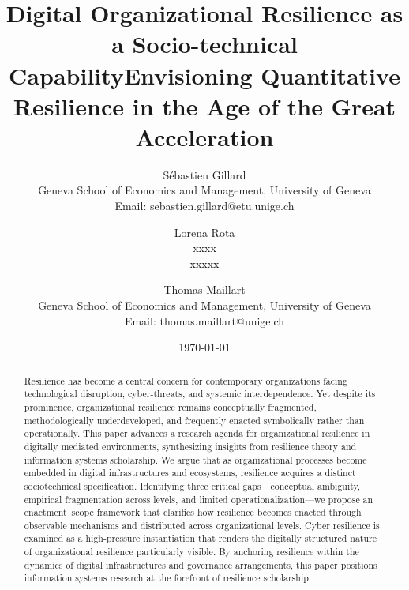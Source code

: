 \documentclass[12pt, letterpaper]{article}
\title{\textbf{Digital Organizational Resilience as a Socio-technical Capability}}
\begin{document}
\title{Envisioning Quantitative Resilience in the Age of the Great Acceleration}

\author{Sébastien Gillard \\
  Geneva School of Economics and Management, University of Geneva \\
  Email: sebastien.gillard@etu.unige.ch
  \and
  Lorena Rota \\
  xxxx \\
  xxxxx
  \and
  Thomas Maillart \\
  Geneva School of Economics and Management, University of Geneva \\
  Email: thomas.maillart@unige.ch \vspace{20pt}}


\date{\today}

\maketitle

\begin{abstract}
\vspace*{4mm}
Resilience has become a central concern for contemporary organizations facing technological disruption, cyber-threats, and systemic interdependence. Yet despite its prominence, organizational resilience remains conceptually fragmented, methodologically underdeveloped, and frequently enacted symbolically rather than operationally. This paper advances a research agenda for organizational resilience in digitally mediated environments, synthesizing insights from resilience theory and information systems scholarship. We argue that as organizational processes become embedded in digital infrastructures and ecosystems, resilience acquires a distinct sociotechnical specification. Identifying three critical gaps—conceptual ambiguity, empirical fragmentation across levels, and limited operationalization—we propose an enactment–scope framework that clarifies how resilience becomes enacted through observable mechanisms and distributed across organizational levels. Cyber resilience is examined as a high-pressure instantiation that renders the digitally structured nature of organizational resilience particularly visible. By anchoring resilience within the dynamics of digital infrastructures and governance arrangements, this paper positions information systems research at the forefront of resilience scholarship.

\end{abstract}
\end{document}
